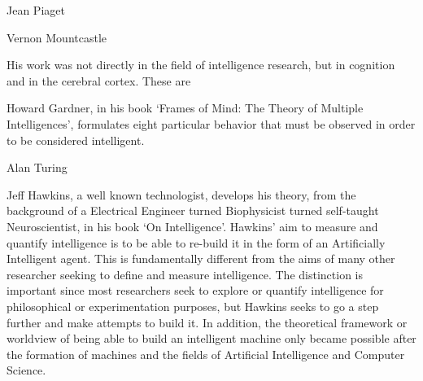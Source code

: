 \documentclass[11pt, oneside]{article}
\begin{document}
\par Jean Piaget


\par Vernon Mountcastle 
\par His work was not directly in the field of intelligence research, but in cognition and in the cerebral cortex. These are 


\par Howard Gardner, in his book `Frames of Mind: The Theory of Multiple Intelligences', formulates eight particular behavior that must be observed in order to be considered intelligent. 


\par Alan Turing


\par Jeff Hawkins, a well known technologist, develops his theory, from the background of a Electrical Engineer turned Biophysicist turned self-taught Neuroscientist, in his book `On Intelligence'. Hawkins' aim to measure and quantify intelligence is to be able to re-build it in the form of an Artificially Intelligent agent. This is fundamentally different from the aims of many other researcher seeking to define and measure intelligence. The distinction is important since most researchers seek to explore or quantify intelligence for philosophical or experimentation purposes, but Hawkins seeks to go a step further and make attempts to build it. In addition, the theoretical framework or worldview of being able to build an intelligent machine only became possible after the formation of machines and the fields of Artificial Intelligence and Computer Science.
\end{document}
